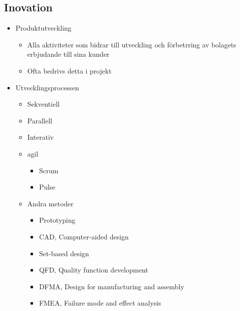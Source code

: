 \begin{multicols}{2}
\subsection{Inovation}
\begin{itemize}
    \item Produktutveckling
    \begin{itemize}
        \item Alla aktiviteter som bidrar till utveckling och förbetrring av bolagets erbjudande till sina kunder
        \item Ofta bedrivs detta i projekt
    \end{itemize}
    \item Utvecklingsprocessen
    \begin{itemize}
        \item Sekventiell
        \item Parallell
        \item Interativ
        \item agil
        \begin{itemize}
            \item Scrum 
            \item Pulse
        \end{itemize}
        \item Andra metoder
        \begin{itemize}
            \item Prototyping
            \item CAD, Computer-aided design
            \item Set-based design
            \item QFD, Quality function development
            \item DFMA, Design for manufacturing and assembly
            \item FMEA, Failure mode and effect analysis 
        \end{itemize}
    \end{itemize}
\end{itemize}



\end{multicols}
